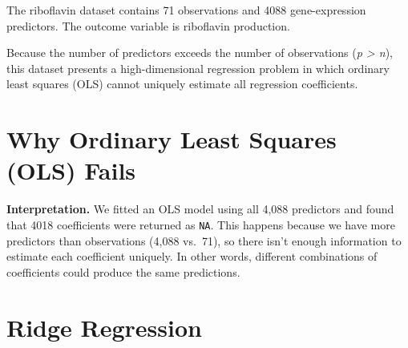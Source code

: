 \documentclass[
  letterpaper,
  DIV=11,
  numbers=noendperiod]{scrreprt}
\newenvironment{Shaded}{\begin{snugshade}}{\end{snugshade}}
\newcommand{\AttributeTok}[1]{\textcolor[rgb]{0.40,0.45,0.13}{#1}}
\newcommand{\CommentTok}[1]{\textcolor[rgb]{0.37,0.37,0.37}{#1}}
\newcommand{\FunctionTok}[1]{\textcolor[rgb]{0.28,0.35,0.67}{#1}}
\newcommand{\NormalTok}[1]{\textcolor[rgb]{0.00,0.23,0.31}{#1}}
\newcommand{\OtherTok}[1]{\textcolor[rgb]{0.00,0.23,0.31}{#1}}
\newcommand{\SpecialCharTok}[1]{\textcolor[rgb]{0.37,0.37,0.37}{#1}}
\begin{document}
The riboflavin dataset contains 71 observations and 4088 gene-expression
predictors. The outcome variable is riboflavin production.

Because the number of predictors exceeds the number of observations
(\emph{p \textgreater{} n}), this dataset presents a high-dimensional
regression problem in which ordinary least squares (OLS) cannot uniquely
estimate all regression coefficients.

\section{Why Ordinary Least Squares (OLS)
Fails}\label{why-ordinary-least-squares-ols-fails}

\begin{Shaded}
\end{Shaded}

\textbf{Interpretation.} We fitted an OLS model using all 4,088
predictors and found that 4018 coefficients were returned as
\texttt{NA}. This happens because we have more predictors than
observations (4,088 vs.~71), so there isn't enough information to
estimate each coefficient uniquely. In other words, different
combinations of coefficients could produce the same predictions.

\section{Ridge Regression}\label{ridge-regression}
\end{document}
